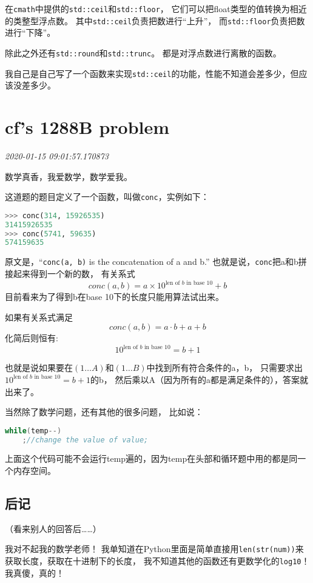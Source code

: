 \documentclass{peterlitsdoc}
\newcommand{\timetx}[1]
    {\par\noindent\emph{\pltgray\small #1}\vspace{2em}}
\newcommand{\vb}{\verb}
\begin{document}
在\vb|cmath|中提供的\vb|std::ceil|和\vb|std::floor|，
它们可以把float类型的值转换为相近的类整型浮点数。
其中\vb|std::ceil|负责把数进行``上升''，
而\vb|std::floor|负责把数进行``下降''。

除此之外还有\vb|std::round|和\vb|std::trunc|。
都是对浮点数进行离散的函数。

我自己是自己写了一个函数来实现\vb|std::ceil|的功能，性能不知道会差多少，但应该没差多少。


\section{cf's 1288B problem}\timetx{2020-01-15 09:01:57.170873}

数学真香，我爱数学，数学爱我。

这道题的题目定义了一个函数，叫做\vb|conc|，实例如下：

\begin{lstlisting}[language=python]
>>> conc(314, 15926535)
31415926535
>>> conc(5741, 59635)
574159635
\end{lstlisting}

原文是，``\vb|conc(a, b)| is the concatenation of a and b.''
也就是说，\vb|conc|把a和b拼接起来得到一个新的数，
有关系式$$conc(a, b) = a\times 10^{\text{len of }b\text{ in base 10}} + b$$
目前看来为了得到b在base 10下的长度只能用算法试出来。

如果有关系式满足$$conc(a, b) = a\cdot b + a + b$$化简后则恒有:
$$10^{\text{len of }b\text{ in base 10}} = b + 1$$

也就是说如果要在$(1\ldots A)$和$(1\ldots B)$中找到所有符合条件的a，b，
只需要求出$10^{\text{len of }b\text{ in base 10}} = b + 1$的b，
然后乘以A（因为所有的a都是满足条件的），答案就出来了。

当然除了数学问题，还有其他的很多问题，
比如说：

\begin{lstlisting}[language=C++]
while(temp--)
    ;//change the value of value;
\end{lstlisting}

上面这个代码可能不会运行temp遍的，因为temp在头部和循环题中用的都是同一个内存空间。

\subsection{后记}
（看来别人的回答后\ldots\ldots ）

我对不起我的数学老师！
我单知道在Python里面是简单直接用\vb|len(str(num))|来获取长度，获取在十进制下的长度，
我不知道其他的函数还有更数学化的\vb|log10|！
我真傻，真的！
\end{document}
